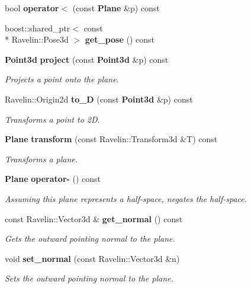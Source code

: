 \begin{DoxyCompactItemize}
\item 
bool {\bfseries operator$<$} (const {\bf Plane} \&p) const \label{classMoby_1_1Plane_ae09c64e9d1b9932a983f374ce6daaf61}

\item 
boost\-::shared\-\_\-ptr$<$ const \\*
Ravelin\-::\-Pose3d $>$ {\bfseries get\-\_\-pose} () const \label{classMoby_1_1Plane_ab84e59e12388876e8633d6a015b0e134}

\item 
{\bf Point3d} {\bf project} (const {\bf Point3d} \&p) const \label{classMoby_1_1Plane_ad111c206860bc0686214e63e76b992f7}

\begin{DoxyCompactList}\small\item\em Projects a point onto the plane. \end{DoxyCompactList}\item 
Ravelin\-::\-Origin2d {\bf to\-\_\-D} (const {\bf Point3d} \&p) const \label{classMoby_1_1Plane_a0e3d453d95102cbe683cd2e2640c4c53}

\begin{DoxyCompactList}\small\item\em Transforms a point to 2\-D. \end{DoxyCompactList}\item 
{\bf Plane} {\bf transform} (const Ravelin\-::\-Transform3d \&T) const \label{classMoby_1_1Plane_a60cce749de640f995fed06f27311f666}

\begin{DoxyCompactList}\small\item\em Transforms a plane. \end{DoxyCompactList}\item 
{\bf Plane} {\bf operator-\/} () const \label{classMoby_1_1Plane_a59ab48628909d11c1c4ae274783b582d}

\begin{DoxyCompactList}\small\item\em Assuming this plane represents a half-\/space, negates the half-\/space. \end{DoxyCompactList}\item 
const Ravelin\-::\-Vector3d \& {\bf get\-\_\-normal} () const \label{classMoby_1_1Plane_a08bcde4941f96fc528f66a49db24d70e}

\begin{DoxyCompactList}\small\item\em Gets the outward pointing normal to the plane. \end{DoxyCompactList}\item 
void {\bf set\-\_\-normal} (const Ravelin\-::\-Vector3d \&n)\label{classMoby_1_1Plane_aac985aefe61a33b73679599428d63a53}

\begin{DoxyCompactList}\small\item\em Sets the outward pointing normal to the plane. \end{DoxyCompactList}\end{DoxyCompactItemize}
